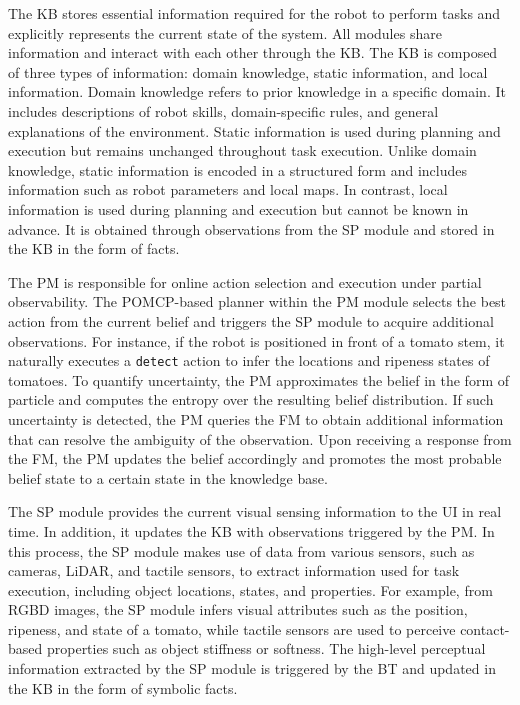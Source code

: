The KB stores essential information required for the robot to perform tasks and explicitly represents the current state of the system. All modules share information and interact with each other through the KB. The KB is composed of three types of information: domain knowledge, static information, and local information. Domain knowledge refers to prior knowledge in a specific domain. It includes descriptions of robot skills, domain-specific rules, and general explanations of the environment. Static information is used during planning and execution but remains unchanged throughout task execution. Unlike domain knowledge, static information is encoded in a structured form and includes information such as robot parameters and local maps. In contrast, local information is used during planning and execution but cannot be known in advance. It is obtained through observations from the SP module and stored in the KB in the form of facts. 


The PM is responsible for online action selection and execution under partial observability. The POMCP-based planner within the PM module selects the best action from the current belief and triggers the SP module to acquire additional observations. For instance, if the robot is positioned in front of a tomato stem, it naturally executes a \texttt{detect} action to infer the locations and ripeness states of tomatoes. To quantify uncertainty, the PM approximates the belief in the form of particle and computes the entropy over the resulting belief distribution. If such uncertainty is detected, the PM queries the FM to obtain additional information that can resolve the ambiguity of the observation. Upon receiving a response from the FM, the PM updates the belief accordingly and promotes the most probable belief state to a certain state in the knowledge base.


The SP module provides the current visual sensing information to the UI in real time. In addition, it updates the KB with observations triggered by the PM. In this process, the SP module makes use of data from various sensors, such as cameras, LiDAR, and tactile sensors, to extract information used for task execution, including object locations, states, and properties. For example, from RGBD images, the SP module infers visual attributes such as the position, ripeness, and state of a tomato, while tactile sensors are used to perceive contact-based properties such as object stiffness or softness. The high-level perceptual information extracted by the SP module is triggered by the BT and updated in the KB in the form of symbolic facts.

